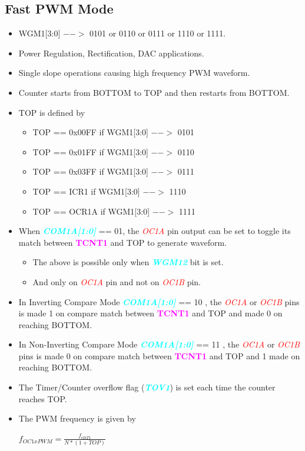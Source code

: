 \documentclass{article}
\newcommand{\bitFormat}[1]{\emph{\textbf{\textcolor{cyan}{#1}}}}
\newcommand{\regFormat}[1]{\textbf{\textcolor{magenta}{#1}}}
\newcommand{\pinFormat}[1]{\emph{\textcolor{red}{#1}}}
\begin{document}
\subsection{Fast PWM Mode}
\begin{itemize}
    \item WGM1[3:0] $-->$ 0101 or 0110 or 0111 or 1110 or 1111.
    \item Power Regulation, Rectification, DAC applications.
    \item Single slope operations causing high frequency PWM waveform.
    \item Counter starts from BOTTOM to TOP and then restarts from BOTTOM.
    \item TOP is defined by
    \begin{itemize}
        \item TOP == 0x00FF if WGM1[3:0] $-->$ 0101
        \item TOP == 0x01FF if WGM1[3:0] $-->$ 0110
        \item TOP == 0x03FF if WGM1[3:0] $-->$ 0111
        \item TOP ==   ICR1 if WGM1[3:0] $-->$ 1110
        \item TOP ==  OCR1A if WGM1[3:0] $-->$ 1111
    \end{itemize}
    \item  When \bitFormat{COM1A[1:0]} == 01, the \pinFormat{OC1A} pin output can be set to toggle its match between \regFormat{TCNT1} and TOP to generate waveform.
    \begin{itemize}
        \item The above is possible only when \bitFormat{WGM12} bit is set.
        \item And only on \pinFormat{OC1A} pin and not on \pinFormat{OC1B} pin.
    \end{itemize}
    \item In Inverting Compare Mode \bitFormat{COM1A[1:0]} == 10 , the \pinFormat{OC1A} or \pinFormat{OC1B} pins is made 1 on compare match between \regFormat{TCNT1} and TOP and made 0 on reaching BOTTOM.
    \item In Non-Inverting Compare Mode \bitFormat{COM1A[1:0]} == 11 , the \pinFormat{OC1A} or \pinFormat{OC1B} pins is made 0 on compare match between \regFormat{TCNT1} and TOP and 1 made  on reaching BOTTOM.
    \item The Timer/Counter overflow flag (\bitFormat{TOV1}) is set each time the counter reaches TOP.
    \item The PWM frequency is given by 
    \begin{center}
        { \Large $f_{OC1xPWM} = \frac{f_{clkT1}}{N * (1+ TOP)}$ }
    \end{center}
\end{itemize}
\end{document}
